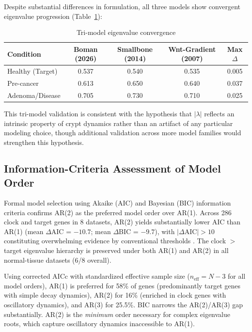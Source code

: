 \documentclass[11pt,a4paper]{article}
\begin{document}
Despite substantial differences in formulation, all three models show convergent eigenvalue progression (Table~\ref{tab:multimodel}):

\begin{table}[H]
\centering
\caption{Tri-model eigenvalue convergence}
\label{tab:multimodel}
\begin{tabular}{lcccc}
\toprule
Condition & Boman (2026) & Smallbone (2014) & Wnt-Gradient (2007) & Max $\Delta$ \\
\midrule
Healthy (Target) & 0.537 & 0.540 & 0.535 & 0.005 \\
Pre-cancer & 0.613 & 0.650 & 0.640 & 0.037 \\
Adenoma/Disease & 0.705 & 0.730 & 0.710 & 0.025 \\
\bottomrule
\end{tabular}
\end{table}

This tri-model validation is consistent with the hypothesis that $|\lambda|$ reflects an intrinsic property of crypt dynamics rather than an artifact of any particular modeling choice, though additional validation across more model families would strengthen this hypothesis.

\subsection{Information-Criteria Assessment of Model Order}

Formal model selection using Akaike (AIC) and Bayesian (BIC) information criteria confirms AR(2) as the preferred model order over AR(1). Across 286 clock and target genes in 8 datasets, AR(2) yields substantially lower AIC than AR(1) (mean $\Delta$AIC = $-10.7$; mean $\Delta$BIC = $-9.7$), with $|\Delta\text{AIC}| > 10$ constituting overwhelming evidence by conventional thresholds \citep{burnham2002}. The clock $>$ target eigenvalue hierarchy is preserved under both AR(1) and AR(2) in all normal-tissue datasets (6/8 overall).

Using corrected AICc with standardized effective sample size ($n_{\text{eff}} = N - 3$ for all model orders), AR(1) is preferred for 58\% of genes (predominantly target genes with simple decay dynamics), AR(2) for 16\% (enriched in clock genes with oscillatory dynamics), and AR(3) for 25.5\%. BIC narrows the AR(2)/AR(3) gap substantially. AR(2) is the \textit{minimum} order necessary for complex eigenvalue roots, which capture oscillatory dynamics inaccessible to AR(1).
\end{document}
